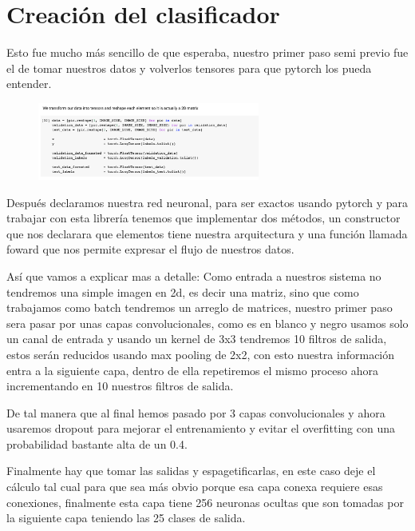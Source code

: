 \documentclass[12pt, fleqn]{report}                             %
\theoremstyle{break}                                            %
\begin{document}
        \clearpage
        \section{Creación del clasificador}

        Esto fue mucho más sencillo de que esperaba, nuestro primer paso semi previo fue el de tomar nuestros datos y volverlos
        tensores para que pytorch los pueda entender.

        \begin{figure}[h!]
            \includegraphics[width=0.65\textwidth]{4}
        \end{figure}

        Después declaramos nuestra red neuronal, para ser exactos usando pytorch y para trabajar con esta librería tenemos
        que implementar dos métodos, un constructor que nos declarara que elementos tiene nuestra arquitectura y una función
        llamada foward que nos permite expresar el flujo de nuestros datos.

        Así que vamos a explicar mas a detalle:
        Como entrada a nuestros sistema no tendremos una simple imagen en 2d, es decir una matriz, sino que como trabajamos como
        batch tendremos un arreglo de matrices, nuestro primer paso sera pasar por unas capas convolucionales,
        como es en blanco y negro usamos solo un canal de entrada y usando un kernel de 3x3 tendremos 10 filtros de salida,
        estos serán reducidos usando max pooling de 2x2, con esto nuestra información entra a la siguiente capa, dentro de ella
        repetiremos el mismo proceso ahora incrementando en 10 nuestros filtros de salida.

        De tal manera que al final hemos pasado por 3 capas convolucionales y ahora usaremos dropout para mejorar
        el entrenamiento y evitar el overfitting con una probabilidad bastante alta de un 0.4.

        Finalmente hay que tomar las salidas y espagetificarlas, en este caso deje el cálculo tal cual para que sea más obvio
        porque esa capa conexa requiere esas conexiones, finalmente esta capa tiene 256 neuronas ocultas que son tomadas por
        la siguiente capa teniendo las 25 clases de salida.
\end{document}
